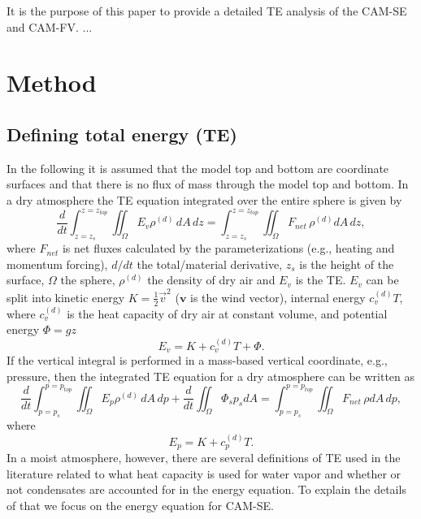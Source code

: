 \documentclass{agujournal}
\begin{document}
It is the purpose of this paper to provide a detailed TE analysis of the CAM-SE and CAM-FV. ...



\section{Method}
\subsection{Defining total energy (TE)}
In the following it is assumed that the model top and bottom are coordinate surfaces and that there is no flux of mass through the model top and bottom. In a dry atmosphere the TE equation integrated over the entire sphere is given by
\begin{equation}
\frac{d}{dt}\int_{z=z_s}^{z=z_{top}}\iint_{\Omega} E_v \rho^{(d)}\, dA\, dz=\int_{z=z_s}^{z=z_{top}}\iint_{\Omega} F_{net}\, \rho^{(d)} dA\, dz,
\end{equation}
\citep[e.g., ][]{K1974MWR} where $F_{net}$ is net fluxes calculated by the parameterizations (e.g., heating and momentum forcing), $d/dt$ the total/material derivative, $z_s$ is the height of the surface, $\Omega$ the sphere, $\rho^{(d)}$ the density of dry air and $E_v$ is the TE. $E_v$ can be split into kinetic energy $K=\frac{1}{2}\vec{v}^2$ ($\mathbf{v}$ is the wind vector), internal energy $c_v^{(d)}T$, where $c_v^{(d)}$ is the heat capacity of dry air at constant volume, and potential energy $\Phi=gz$
\begin{equation}
E_v=K+c_v^{(d)}T+\Phi.
\end{equation}
If the vertical integral is performed in a mass-based vertical coordinate, e.g., pressure, then the integrated TE equation for a dry atmosphere can be written as
\begin{equation}
\frac{d}{dt}\int_{p=p_s}^{p=p_{top}}\iint_{\Omega} E_p \rho^{(d)}\, dA\, dp + \frac{d}{dt}\iint_{\Omega}\Phi_sp_s dA =\int_{p=p_s}^{p=p_{top}}\iint_{\Omega} F_{net}\, \rho dA\, dp,
\end{equation}
\citep[e.g., ][]{K1974MWR} where
\begin{equation}
E_p=K+c_p^{(d)}T.
\end{equation}
In a moist atmosphere, however, there are several definitions of TE used in the literature related to what heat capacity is used for water vapor and whether or not condensates are accounted for in the energy equation. To explain the details of that we focus on the energy equation for CAM-SE.
\end{document}
